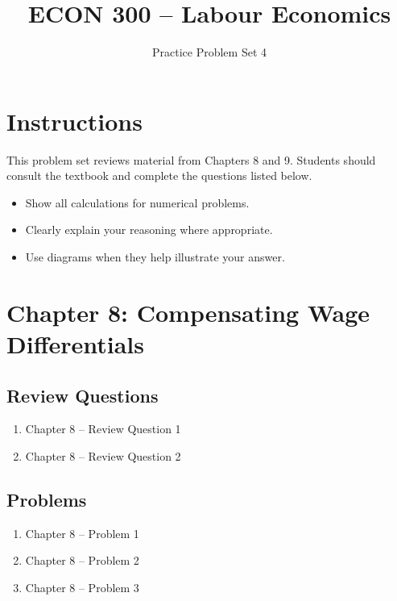 \documentclass[12pt]{article}
\title{\textbf{ECON 300 -- Labour Economics}}
\author{Practice Problem Set 4}
\date{}
\begin{document}
\maketitle

\section*{Instructions}

This problem set reviews material from Chapters 8 and 9.  
Students should consult the textbook and complete the questions listed below.

\begin{itemize}
\item Show all calculations for numerical problems.
\item Clearly explain your reasoning where appropriate.
\item Use diagrams when they help illustrate your answer.
\end{itemize}

\vspace{0.5cm}

\section*{Chapter 8: Compensating Wage Differentials}

\subsection*{Review Questions}

\begin{enumerate}
\item Chapter 8 -- Review Question 1
\item Chapter 8 -- Review Question 2
\end{enumerate}

\subsection*{Problems}

\begin{enumerate}
\item Chapter 8 -- Problem 1
\item Chapter 8 -- Problem 2
\item Chapter 8 -- Problem 3
\end{enumerate}

\vspace{0.5cm}
\end{document}
